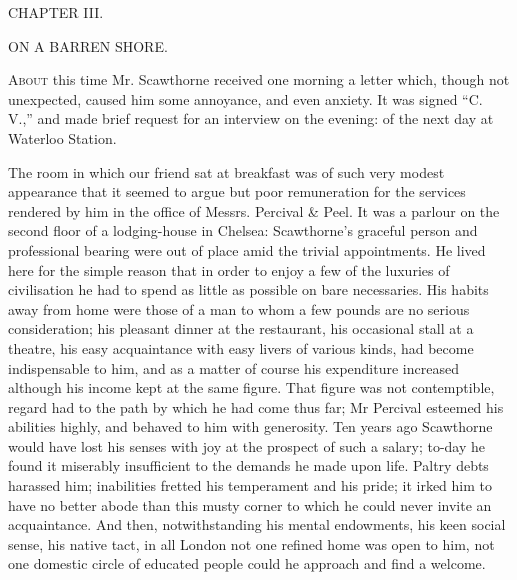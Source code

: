 {}

{CHAPTER III.}

ON A BARREN SHORE.

\textsc{About} this time Mr. Scawthorne received one morning a letter
which, though not unexpected, caused him some annoyance, and even
anxiety. It was signed ``C. V.,'' and made brief request for an
interview on the evening: of the next day at Waterloo Station.

The room in which our friend sat at breakfast was of such very modest
appearance that it seemed to argue but poor remuneration for the
services rendered by him in the office of Messrs. Percival \& Peel. It
was a parlour on the second floor of a lodging-house in Chelsea:
Scawthorne's graceful person and professional bearing were out of place
amid the trivial appointments. He lived here for the simple reason that
in order to enjoy a few of the luxuries of civilisation he had to spend
as little as possible on bare necessaries. His habits {}away from home
were those of a man to whom a few pounds are no serious consideration;
his pleasant dinner at the restaurant, his occasional stall at a
theatre, his easy acquaintance with easy livers of various kinds, had
become indispensable to him, and as a matter of course his expenditure
increased although his income kept at the same figure. That figure was
not contemptible, regard had to the path by which he had come thus far;
Mr Percival esteemed his abilities highly, and behaved to him with
generosity. Ten years ago Scawthorne would have lost his senses with joy
at the prospect of such a salary; to-day he found it miserably
insufficient to the demands he made upon life. Paltry debts harassed
him; inabilities fretted his temperament and his pride; it irked him to
have no better abode than this musty corner to which he could never
invite an acquaintance. And then, notwithstanding his mental endowments,
his keen social sense, his native tact, in all London not one refined
home was open to him, not one domestic circle of educated people could
he approach and find a welcome.

